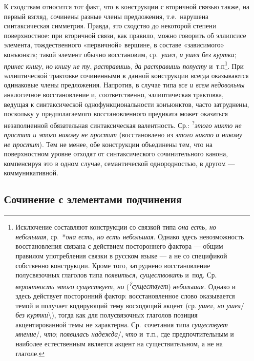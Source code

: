 К сходствам относится тот факт, что в конструкции с вторичной связью
также, на первый взгляд, сочинены разные члены предложения,
т.е.~нарушена синтаксическая симметрия. Правда, это сходство до
некоторой степени поверхностное: при вторичной связи, как правило, можно
говорить об эллипсисе элемента, тождественного «первичной» вершине, в
составе «зависимого» конъюнкта; такой элемент обычно восстановим,
ср.~\textit{ушел}, \textit{и ушел без куртки}; \textit{принес книгу},
\textit{но} \textit{книгу не ту}, \textit{растравишь}, \textit{да растравишь
  попусту} и~т.п\footnote{Исключение составляют конструкции со связкой
  типа \textit{она есть, но небольшая}, ср.~*\textit{она есть, но есть
    небольшая.} Однако здесь невозможность восстановления связана с
  действием постороннего фактора --- общим правилом употребления связки в
  русском языке --- а не со спецификой собственно конструкции. Кроме
  того, затруднено восстановление полусвязочных глаголов типа
  \textit{появиться, существовать} и~под. Ср. \textit{вероятность этого
    существует, но} (\textit{\textsuperscript{?}существует})
  \textit{небольшая.} Однако и здесь действует посторонний фактор:
  восстановленное слово оказывается темой и получает кодирующий тему
  восходящий акцент (ср. \textit{ушел, но ушел}/ \textit{без
    куртки}\textbackslash), тогда как для полусвязочных глаголов позиция
  акцентированной темы не характерна. Ср.~сочетания типа
  \textit{существует мнение}/\textit{, что}; \textit{появилась надежда}/,
  \textit{что} и~т.п., где предпочтительным и наиболее естественным
  является акцент на существительном, а не на глаголе.}. При
эллиптической трактовке сочиненными в данной конструкции всегда
оказываются одинаковые члены предложения. Напротив, в случае типа
\textit{все и всем недовольны} аналогичное восстановление и,
соответственно, эллиптическая трактовка, ведущая к синтаксической
однофункциональности конъюнктов, часто затруднены, поскольку у
предполагаемого восстановленного предиката может оказаться незаполненной
обязательная синтаксическая валентность. Ср.:
\textsuperscript{?}\textit{этого никто не простит и этого никому не
  простит} (восстановлено из \textit{этого никто и никому не простит}). Тем
не менее, обе конструкции объединены тем, что на поверхностном уровне
отходят от синтаксического сочинительного канона, компенсируя это в
одном случае, семантической однородностью, в другом --- коммуникативной.

\subsection{Сочинение с элементами
  подчинения}\label{ux441ux43eux447ux438ux43dux435ux43dux438ux435-ux441-ux44dux43bux435ux43cux435ux43dux442ux430ux43cux438-ux43fux43eux434ux447ux438ux43dux435ux43dux438ux44f}

